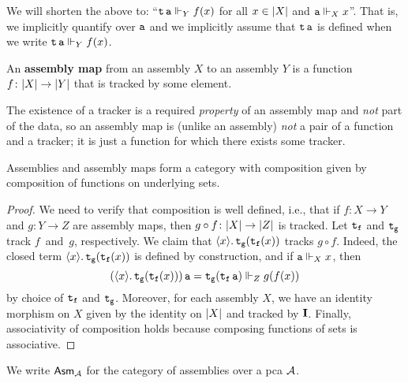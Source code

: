 \begin{notation}
  We will shorten the above to: ``\(\pca{t}\pca{a} \realizes_Y f(x)\)
  for all \(x \in \carrier{X}\) and \(\pca{a} \realizes_X x\)''.
  That is, we implicitly quantify over \(\pca{a}\) and we implicitly assume that
  \(\pca{t}\pca{a}\) is defined when we write
  \(\pca{t}\pca{a} \realizes_Y f(x)\).
\end{notation}

\begin{definition}
  An \textbf{assembly map} from an assembly \(X\) to an assembly \(Y\) is a
  function \(f \colon \carrier{X} \to \carrier{Y}\) that is tracked by some
  element.
\end{definition}

The existence of a tracker is a required \emph{property} of an assembly map and
\emph{not} part of the data, so an assembly map is (unlike an assembly)
\emph{not} a pair of a function and a tracker; it is just a function for which
there exists some tracker.

\begin{proposition}
  Assemblies and assembly maps form a category with composition given
  by composition of functions on underlying sets.
\end{proposition}
\begin{proof}
  We need to verify that composition is well defined, i.e., that if
  \(f \colon X \to Y\) and \(g \colon Y \to Z\) are assembly maps, then
  \(g \circ f \colon \carrier{X} \to \carrier{Z}\) is tracked.
  Let \(\pca{t_f}\) and \(\pca{t_g}\) track \(f\)~and~\(g\), respectively.  We
  claim that \(\lambdapca{x}{\pca{t_g}(\pca{t_f}(x))}\) tracks \(g \circ
  f\). Indeed, the closed term \(\lambdapca{x}{\pca{t_g}(\pca{t_f}(x))}\) is
  defined by construction, and if \(\pca{a} \realizes_X x\), then
  \[
    {(\lambdapca{x}{\pca{t_g}(\pca{t_f}(x)}))\pca{a} =
    \pca{t_g}(\pca{t_f}\pca{a})} \realizes_Z g(f(x))
  \]
  by choice of \(\pca{t_f}\) and \(\pca{t_g}\).
  Moreover, for each assembly \(X\), we have an identity morphism on \(X\) given
  by the identity on \(\carrier{X}\) and tracked by \(\icomb\).
  Finally, associativity of composition holds because composing functions of
  sets is associative.
\end{proof}

\begin{notation}[\(\Asm{\AA}\)]
  We write \(\Asm{\AA}\) for the category of assemblies over a pca \(\AA\).
\end{notation}

